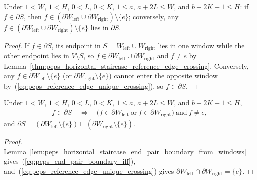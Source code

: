 \begin{lemma}
    \label{lem:peps_horizontal_staircase_end_pair_boundary_from_windows}
    \leanok
    Under $1<W$, $1<H$, $0<L$, $0<K$, $1\le a$, $a+2L\le W$, and $b+2K-1\le H$:
    if $f\in\partial S$, then
    $f\in(\partial W_{\mathrm{left}}\cup\partial W_{\mathrm{right}})\setminus\{e\}$;
    conversely, any
    $f\in(\partial W_{\mathrm{left}}\cup\partial W_{\mathrm{right}})\setminus\{e\}$
    lies in $\partial S$.
\end{lemma}
\begin{proof}\leanok
    If $f\in\partial S$, its endpoint in $S=W_{\mathrm{left}}\cup W_{\mathrm{right}}$
    lies in one window while the other endpoint lies in $V\setminus S$, so
    $f\in\partial W_{\mathrm{left}}\cup\partial W_{\mathrm{right}}$ and $f\ne e$
    by Lemma~\ref{thm:peps_horizontal_staircase_reference_edge_crossing}.
    Conversely, any $f\in\partial W_{\mathrm{left}}\setminus\{e\}$ (or
    $\partial W_{\mathrm{right}}\setminus\{e\}$) cannot enter the opposite
    window by~(\ref{eq:peps_reference_edge_unique_crossing}), so $f\in\partial S$.
\end{proof}

\begin{lemma}
    \label{thm:peps_horizontal_staircase_end_pair_boundary}
    \leanok
    Under $1<W$, $1<H$, $0<L$, $0<K$, $1\le a$, $a+2L\le W$, and $b+2K-1\le H$,
    \begin{align}
        f\in\partial S
        \quad\Longleftrightarrow\quad
        \bigl(f\in\partial W_{\mathrm{left}}
        \ \text{or}\
        f\in\partial W_{\mathrm{right}}\bigr)
        \ \text{and}\ f\ne e,
        \label{eq:peps_end_pair_boundary_iff}
    \end{align}
    and $\partial S=(\partial W_{\mathrm{left}}\setminus\{e\})\sqcup(\partial W_{\mathrm{right}}\setminus\{e\})$.
\end{lemma}
\begin{proof}\leanok
    Lemma~\ref{lem:peps_horizontal_staircase_end_pair_boundary_from_windows}
    gives~(\ref{eq:peps_end_pair_boundary_iff}), and~(\ref{eq:peps_reference_edge_unique_crossing})
    gives $\partial W_{\mathrm{left}}\cap\partial W_{\mathrm{right}}=\{e\}$.
\end{proof}

